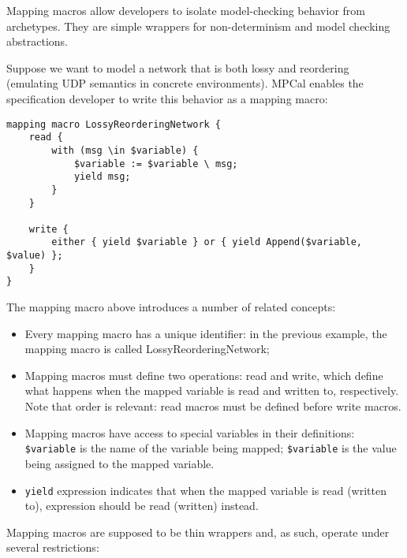 Mapping macros allow developers to isolate model-checking behavior from archetypes. They are simple wrappers for non-determinism and model checking abstractions.

Suppose we want to model a network that is both lossy and reordering (emulating UDP semantics in concrete environments). MPCal enables the specification developer to write this behavior as a mapping macro:

\begin{lstlisting}[language=pcal]
mapping macro LossyReorderingNetwork {
    read {
        with (msg \in $variable) {
            $variable := $variable \ msg;
            yield msg;
        }
    }
    
    write {
        either { yield $variable } or { yield Append($variable, $value) };
    }
}
\end{lstlisting}

The mapping macro above introduces a number of related concepts:

\begin{itemize}
    \item Every mapping macro has a unique identifier: in the previous example, the mapping macro is called LossyReorderingNetwork;
    \item Mapping macros must define two operations: read and write, which define what happens when the mapped variable is read and written to, respectively. Note that order is relevant: read macros must be defined before write macros.
    \item Mapping macros have access to special variables in their definitions: \lstinline|$variable| is the name of the variable being mapped; \lstinline|$variable| is the value being assigned to the mapped variable.
    \item \lstinline|yield| expression indicates that when the mapped variable is read (written to), expression should be read (written) instead.
\end{itemize}

Mapping macros are supposed to be thin wrappers and, as such, operate under several restrictions:

